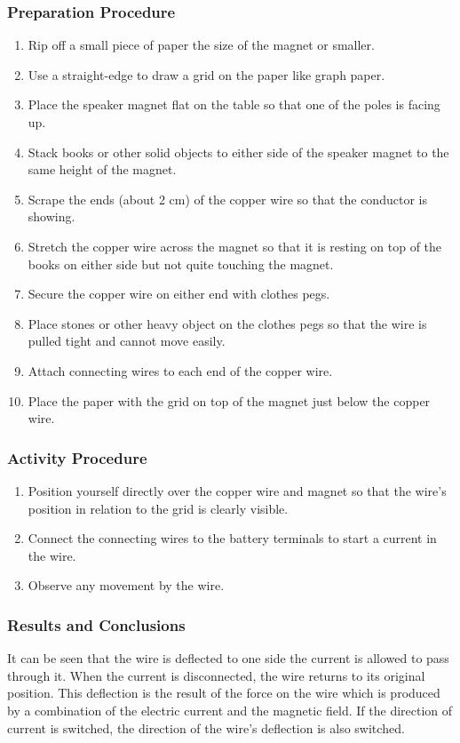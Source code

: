 \subsubsection*{Preparation Procedure}
\begin{enumerate}
\item{Rip off a small piece of paper the size of the magnet or smaller.} 
\item{Use a straight-edge to draw a grid on the paper like graph paper.} 
\item{Place the speaker magnet flat on the table so that one of the poles is facing up.} 
\item{Stack books or other solid objects to either side of the speaker magnet to the same height of the magnet.} 
\item{Scrape the ends (about 2 cm) of the copper wire so that the conductor is showing.} 
\item{Stretch the copper wire across the magnet so that it is resting on top of the books on either side but not quite touching the magnet.} 
\item{Secure the copper wire on either end with clothes pegs.} 
\item{Place stones or other heavy object on the clothes pegs so that the wire is pulled tight and cannot move easily.} 
\item{Attach connecting wires to each end of the copper wire.} 
\item{Place the paper with the grid on top of the magnet just below the copper wire.} 
\end{enumerate}

\subsubsection*{Activity Procedure}
\begin{enumerate}
\item{Position yourself directly over the copper wire and magnet so that the wire's position in relation to the grid is clearly visible.} 
\item{Connect the connecting wires to the battery terminals to start a current in the wire.} 
\item{Observe any movement by the wire.} 
\end{enumerate}

\subsubsection*{Results and Conclusions}
It can be seen that the wire is deflected to one side the current is allowed to pass through it. When the current is disconnected, the wire returns to its original position. This deflection is the result of the force on the wire which is produced by a combination of the electric current and the magnetic field.  
If the direction of current is switched, the direction of the wire's deflection is also switched.  

